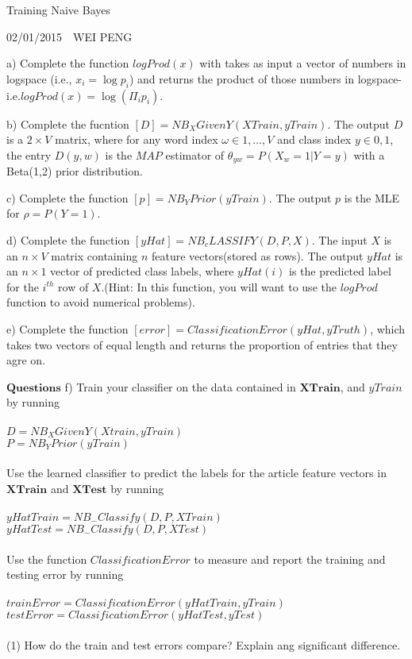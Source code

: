 \documentclass[a4paper]{article}
\begin{document}
	\LARGE{	\begin{center}
		Training Naive Bayes 
		\end{center}
	}
	\normalsize{\begin{center}
			02/01/2015~~WEI PENG
		\end{center}
	}	
	\noindent 
	a) Complete the function $logProd(x)$ with takes as input a vector of numbers in logspace (i.e., $x_i=\log p_i$) and returns the product of those numbers in logspace-i.e.$logProd(x)=\log(\Pi_ip_i)$.
	
	b) Complete the fucntion $[D]=NB_XGivenY(XTrain,yTrain)$. The output $D$ is a $2\times V$ matrix, where for any word index $\omega\in {1,\dots,V}$ and class index $y\in {0,1}$, the entry $D(y,w)$ is the $MAP$ estimator of $\theta_{yw}=P(X_w=1|Y=y)$ with a Beta(1,2) prior distribution.
	
	c) Complete the function $[p]=NB_YPrior(yTrain)$. The output $p$ is the MLE for $\rho=P(Y=1)$.
	
	d) Complete the function $[yHat]=NB_cLASSIFY(D,P,X)$. The input $X$ is an $n\times V$ matrix containing $n$ feature vectors(stored as rows). The output $yHat$ is an $n\times 1$ vector of predicted class labels, where $yHat(i)$ is the predicted label for the $i^{th}$ row of $X$.(Hint: In this function, you will want to use the $logProd$ function to avoid numerical problems).
	
	e) Complete the function $[error]=ClassificationError(yHat,yTruth)$, which takes two vectors of equal length and returns the proportion of entries that they agre on. 
	
$\bm{Questions}$
f) Train your classifier on the data contained in $\bm{XTrain}$, and $yTrain$ by running\\
\\
\textbf{$D=NB_XGivenY(Xtrain,yTrain)$}\\
\textbf{$P=NB_YPrior(yTrain)$}\\
\\
Use the learned classifier to predict the labels for the article feature vectors in $\bm{XTrain}$ and $\bm{XTest}$ by running\\
\\
\textbf{$yHatTrain=NB_{-}Classify(D,P,XTrain)$}\\
\textbf{$yHatTest=NB_{-}Classify(D,P,XTest)$}\\
\\
Use the function $ClassificationError$ to measure and report the training and testing error by running \\
\\
\textbf{$trainError= ClassificationError(yHatTrain, yTrain)$}\\
\textbf{$testError= ClassificationError(yHatTest, yTest)$}\\
\\
(1) How do the train and test errors compare? Explain ang significant difference.
\end{document}
